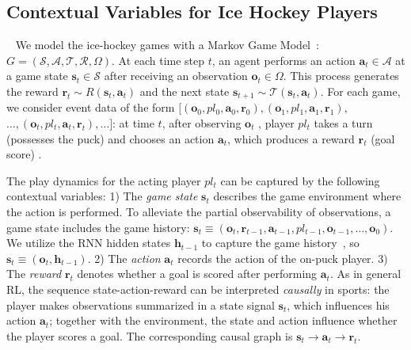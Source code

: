 \documentclass{article}
\newcommand{\hiddenstate}{\mathbf{h}}
\newcommand{\state}{\mathbf{s}}
\newcommand{\action}{\mathbf{a}}
\newcommand{\reward}{\boldsymbol{r}}
\newcommand{\player}{pl}
\newcommand{\observation}{\boldsymbol{o}}
\begin{document}
\subsection{Contextual Variables for Ice Hockey Players}~\label{sec:context-nhl}
We model the ice-hockey games with a Markov Game Model~\cite{Littman1994}: $G=(\mathcal{S}, \mathcal{A}, \mathcal{T}, \mathcal{R}, \Omega)$. 
At each time step $t$, an agent performs an action $\action_{t} \in \mathcal{A}$ at a game state $\state_{t} \in \mathcal{S}$ after receiving an observation $\observation_{t} \in \Omega$. 
This process generates the reward
$\reward_{t} \sim R(\state_t, \action_t)$ and the next state $\state_{t+1} \sim \mathcal{T}(\state_t, \action_t)$.
For each game, we consider event data of the form $[(\observation_0,\player_0,\action_0,\reward_0),(\observation_1,\player_1,\action_1,\reward_1),$ $\ldots,(\observation_{t},\player_{t},\action_{t},\reward_{t}),\ldots]$:
at time $t$, after observing %
$\observation_{t}$
, player $\player_{t}$ takes a turn (possesses the puck) and chooses an action $\action_{t}$, which produces a reward $\reward_{t}$ (goal score) .

The play dynamics for the acting player $\player_{t}$ can be captured by the following contextual variables:
1) The {\it game state} $\state_{t}$ describes the game environment where the action is performed. 
To alleviate the partial observability of observations, a game state includes the game history: $\state_{t} \equiv (\observation_t, \reward_{t-1},\action_{t-1},\player_{t-1},\observation_{t-1},\ldots,\observation_{0})$. We utilize the RNN hidden states $\hiddenstate_{t-1}$ to capture the game history~\cite{littlestone}, so $\state_t \equiv (\observation_{t},\hiddenstate_{t-1})$.
2) The {\it action} $\action_t$ records the action of the on-puck player. 3) The {\it reward} $\reward_{t}$ denotes whether a goal is scored after performing $\action_t$. As in general RL, the sequence state-action-reward can be interpreted {\em causally} in sports: the player makes observations summarized in a state signal $\state_t$, which influences his action $\action_t$; together with the environment, the state and action influence whether the player scores a goal. The corresponding causal graph is $\state_{t}\rightarrow \action_{t}\rightarrow\reward_{t}$. 
\end{document}
